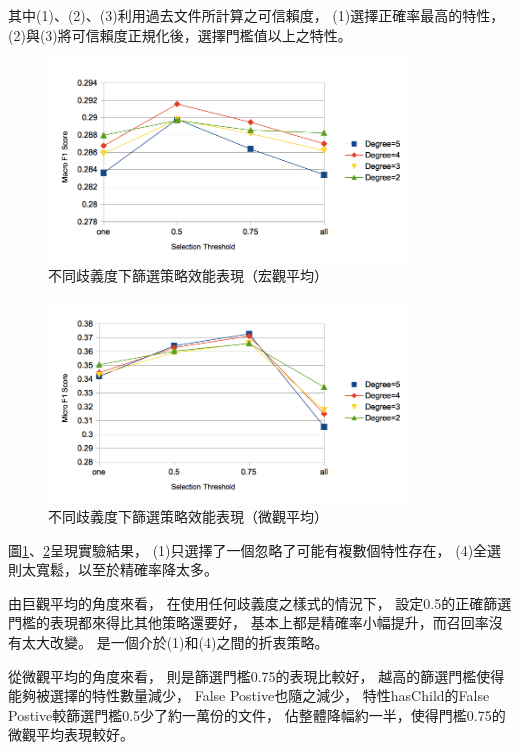 其中(1)、(2)、(3)利用過去文件所計算之可信賴度，
(1)選擇正確率最高的特性，
(2)與(3)將可信賴度正規化後，選擇門檻值以上之特性。

\begin{figure}[h]
    \centering
    \includegraphics[width=0.85\textwidth]{images/04-macro-nol}
    \caption{不同歧義度下篩選策略效能表現（宏觀平均）}
    \label{i:macro-nol}
\end{figure}

\begin{figure}[h]
    \centering
    \includegraphics[width=0.85\textwidth]{images/04-micro-nol}
    \caption{不同歧義度下篩選策略效能表現（微觀平均）}
    \label{i:micro-nol}
\end{figure}

圖\ref{i:macro-nol}、\ref{i:micro-nol}呈現實驗結果，
(1)只選擇了一個忽略了可能有複數個特性存在，
(4)全選則太寬鬆，以至於精確率降太多。

由巨觀平均的角度來看，
在使用任何歧義度之樣式的情況下，
設定0.5的正確篩選門檻的表現都來得比其他策略還要好，
基本上都是精確率小幅提升，而召回率沒有太大改變。
是一個介於(1)和(4)之間的折衷策略。

從微觀平均的角度來看，
則是篩選門檻0.75的表現比較好，
越高的篩選門檻使得能夠被選擇的特性數量減少，
False Postive也隨之減少，
特性hasChild的False Postive較篩選門檻0.5少了約一萬份的文件，
佔整體降幅約一半，使得門檻0.75的微觀平均表現較好。

